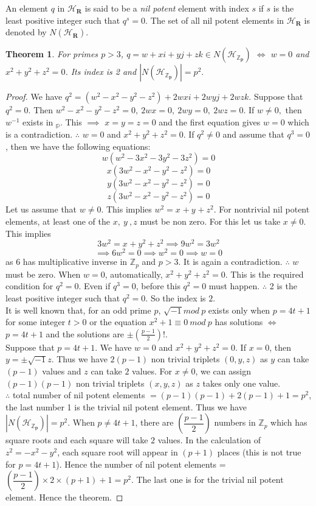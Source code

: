 \documentclass[sn-mathphys,Numbered]{sn-jnl}%
\theoremstyle{thmstyleone}
\newtheorem{theorem}{Theorem}
\theoremstyle{thmstyletwo}
\theoremstyle{thmstylethree}
\begin{document}
An element $q$ in $\mathcal{H_{\mathbf{R}}}$ is said to be a \textit{nil potent} element with index $s$ if $s$ is the least positive integer such that $q^{s}=0.$ The set of all nil potent elements in $\mathcal{H_{\mathbf{R}}}$ is denoted by $N(\mathcal{H_{\mathbf{R}}})$. 
\begin{theorem}
For primes $p>3$, $q=w+xi+yj+zk \in N(\mathcal{H_{\mathbf{\mathbb{Z}_{p}}}})$ $\iff$ $w=0$ and $x^{2}+y^{2}+z^{2}=0$. Its index is 2 and $|N(\mathcal{H_{\mathbf{\mathbb{Z}_{p}}}})|=p^{2}.$ 
\end{theorem}
\begin{proof}
We have $q^{2}=(w^{2}-x^{2}-y^{2}-z^{2})+2wxi+2wyj+2wzk.$ Suppose that $q^{2}=0$. Then $w^{2}-x^{2}-y^{2}-z^{2}=0, \ 2wx=0, \ 2wy=0, \ 2wz=0$. If $w \neq 0, $ then $w^{-1}$ exists in $\mathbb{_{p}}$. This $\implies$ $x=y=z=0$ and the first equation gives $w=0$ which is a contradiction. $\therefore$ $w=0 $ and $x^{2}+y^{2}+z^{2}=0$. If $q^{2} \neq 0$ and assume that $q^{3}=0$, then we have the following equations: \\
$$w(w^{2}-3x^{2}-3y^{2}-3z^{2})=0$$ 
$$x(3w^{2}-x^{2}-y^{2}-z^{2})=0$$ 
$$y(3w^{2}-x^{2}-y^{2}-z^{2})=0$$ 
$$z(3w^{2}-x^{2}-y^{2}-z^{2})=0$$ 
Let us assume that $w \neq 0$. This implies $w^{2}=x^{}+y^{}+z^{2}.$ 
For nontrivial nil potent elements, at least one of the $x, \ y \ ,z$  must be non zero. For this let us take $x\neq 0$. This implies $$3w^{2}=x^{}+y^{2}+z^{2} \implies 9w^{2}=3w^{2}$$
$$\implies 6w^{2}=0 \implies w^{2}=0 \implies w=0$$ as $6$ has multiplicative inverse in $\mathbb{Z}_{p}$ and $p>3.$ It is again a contradiction. $\therefore$ $w$ must be zero. When $w=0$, automatically, $x^{2}+y^{2}+z^{2}=0$. This is the required condition for $q^{2}=0$. Even if $q^{3}=0$, before this $q^{2}=0$ must happen. $\therefore $ 2 is the least positive integer such that $q^{2}=0$. So the index is $2$.  \\
It is well known that, for an odd prime $p$, $\sqrt{-1} mod \ p $ exists only when $p=4t+1$ for some integer $t>0$ or the equation $x^{2}+1 \equiv 0 \ mod \ p$ has solutions $\iff$ $p=4t+1$ and the solutions are $\pm (\frac{p-1}{2})!$. \\
Suppose that $p=4t+1$. We have $w=0$ and $x^{2}+y^{2}+z^{2}=0$. If $x=0$, then $y=\pm\sqrt{-1}z$. Thus we have $2(p-1)$ non trivial triplets $(0,y,z)$ as $y$ can take $(p-1)$ values and $z$ can take $2$ values. For $x \neq 0$, we can assign $(p-1)(p-1)$ non trivial triplets $(x,y,z )$ as $z$ takes only one value. \\
$\therefore $ total number of nil potent elements $= (p-1)(p-1)+2(p-1)+1=p^2 $, the last number 1 is the trivial nil potent element. Thus we have $|N(\mathcal{H_{\mathbf{\mathbb{Z}_{p}}}})|=p^{2}.$ When $p\neq 4t+1$, there are $(\dfrac{p-1}{2})$ numbers in $\mathbb{Z}_{p}$ which has square roots and each square will take $2$ values. In the calculation of $z^{2}=-x^{2}-y^{2}$, each square root will appear in $(p+1)$ places (this is not true for $p=4t+1$). Hence the number of nil potent elements = $(\dfrac{p-1}{2}) \times 2 \times (p+1) +1 =p^{2}$. The last one is for the trivial nil potent element. Hence the theorem.
\end{proof}
\end{document}
